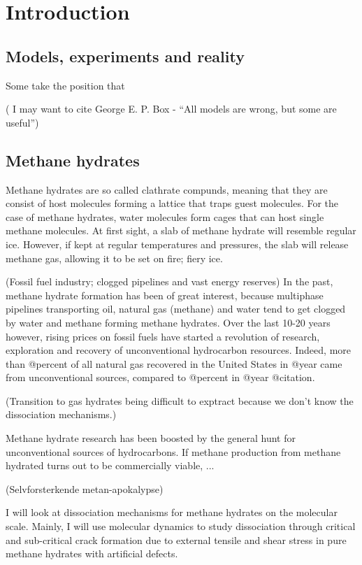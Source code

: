 \chapter{Introduction}
\section{Models, experiments and reality}
Some take the position that 

( I may want to cite George E. P. Box - ``All models are wrong, but some are useful'')

\section{Methane hydrates}
Methane hydrates are so called clathrate compunds, meaning that they are consist of host molecules forming a lattice that traps guest molecules. For the case of methane hydrates, water molecules form cages that can host single methane molecules. At first sight, a slab of methane hydrate will resemble regular ice. However, if kept at regular temperatures and pressures, the slab will release methane gas, allowing it to be set on fire; fiery ice. 

(Fossil fuel industry; clogged pipelines and vast energy reserves)
In the past, methane hydrate formation has been of great interest, because multiphase pipelines transporting oil, natural gas (methane) and water tend to get clogged by water and methane forming methane hydrates. Over the last 10-20 years however, rising prices on fossil fuels have started a revolution of research, exploration and recovery of unconventional hydrocarbon resources. Indeed, more than @percent of all natural gas recovered in the United States in @year came from unconventional sources, compared to @percent in @year @citation. 

(Transition to gas hydrates being difficult to exptract because we don't know the dissociation mechanisms.)

Methane hydrate research has been boosted by the general hunt for unconventional sources of hydrocarbons. If methane production from methane hydrated turns out to be commercially viable, ...

(Selvforsterkende metan-apokalypse)

I will look at dissociation mechanisms for methane hydrates on the molecular scale. Mainly, I will use molecular dynamics to study dissociation through critical and sub-critical crack formation due to external tensile and shear stress in pure methane hydrates with artificial defects. 

